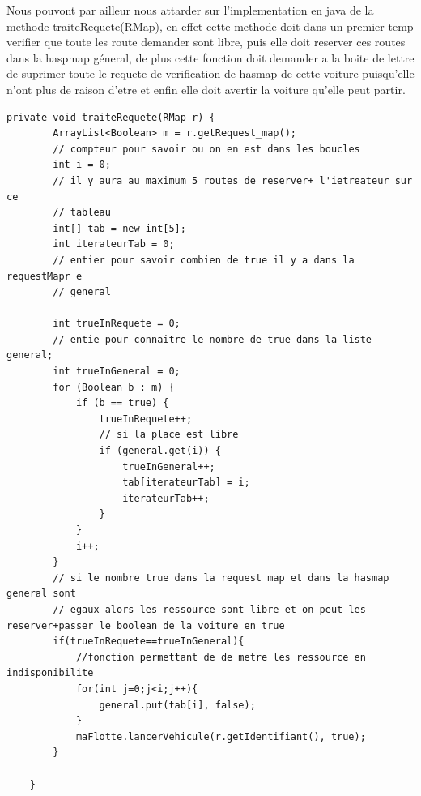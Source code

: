\documentclass[a4paper, titlepage]{report}
\begin{document}
Nous pouvont par ailleur nous attarder sur l'implementation en java de la methode traiteRequete(RMap), en effet cette methode doit dans un premier temp verifier que toute les route demander sont libre, puis elle doit reserver ces routes dans la haspmap géneral, de plus cette fonction doit demander a la boite de lettre de suprimer toute le requete de verification de hasmap de cette voiture puisqu'elle n'ont plus de raison d'etre et enfin elle doit avertir la voiture qu'elle peut partir.	
\begin{lstlisting}
private void traiteRequete(RMap r) {
		ArrayList<Boolean> m = r.getRequest_map();
		// compteur pour savoir ou on en est dans les boucles
		int i = 0;
		// il y aura au maximum 5 routes de reserver+ l'ietreateur sur ce
		// tableau
		int[] tab = new int[5];
		int iterateurTab = 0;
		// entier pour savoir combien de true il y a dans la requestMapr e
		// general

		int trueInRequete = 0;
		// entie pour connaitre le nombre de true dans la liste general;
		int trueInGeneral = 0;
		for (Boolean b : m) {
			if (b == true) {
				trueInRequete++;
				// si la place est libre
				if (general.get(i)) {
					trueInGeneral++;
					tab[iterateurTab] = i;
					iterateurTab++;
				}
			}
			i++;
		}
		// si le nombre true dans la request map et dans la hasmap general sont
		// egaux alors les ressource sont libre et on peut les reserver+passer le boolean de la voiture en true
		if(trueInRequete==trueInGeneral){
			//fonction permettant de de metre les ressource en indisponibilite
			for(int j=0;j<i;j++){
				general.put(tab[i], false);
			}
			maFlotte.lancerVehicule(r.getIdentifiant(), true);	
		}

	}
\end{lstlisting}
\end{document}
